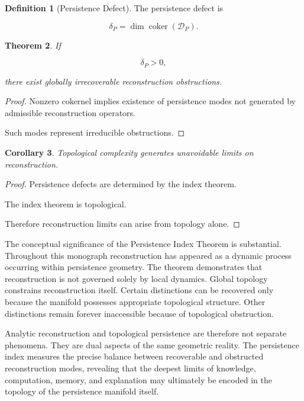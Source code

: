 \documentclass[12pt,oneside]{article}
\newtheorem{theorem}{Theorem}[section] \newtheorem{lemma}[theorem]{Lemma} \newtheorem{proposition}[theorem]{Proposition} \newtheorem{corollary}[theorem]{Corollary}
\theoremstyle{definition}
\newtheorem{definition}[theorem]{Definition} \newtheorem{axiom}[theorem]{Axiom} \newtheorem{remark}[theorem]{Remark} \newtheorem{example}[theorem]{Example}
\begin{document}
\begin{definition}[Persistence Defect]

The persistence defect is

\[
\delta_P
=
\dim
\operatorname{coker}(\mathcal D_P).
\]

\end{definition}

\begin{theorem}

If

\[
\delta_P>0,
\]

there exist globally irrecoverable reconstruction obstructions.

\end{theorem}

\begin{proof}

Nonzero cokernel implies existence of persistence modes not generated by admissible reconstruction operators.

Such modes represent irreducible obstructions.

\end{proof}

\begin{corollary}

Topological complexity generates unavoidable limits on reconstruction.

\end{corollary}

\begin{proof}

Persistence defects are determined by the index theorem.

The index theorem is topological.

Therefore reconstruction limits can arise from topology alone.

\end{proof}

The conceptual significance of the Persistence Index Theorem is substantial. Throughout this monograph reconstruction has appeared as a dynamic process occurring within persistence geometry. The theorem demonstrates that reconstruction is not governed solely by local dynamics. Global topology constrains reconstruction itself. Certain distinctions can be recovered only because the manifold possesses appropriate topological structure. Other distinctions remain forever inaccessible because of topological obstruction.

Analytic reconstruction and topological persistence are therefore not separate phenomena. They are dual aspects of the same geometric reality. The persistence index measures the precise balance between recoverable and obstructed reconstruction modes, revealing that the deepest limits of knowledge, computation, memory, and explanation may ultimately be encoded in the topology of the persistence manifold itself.
\end{document}
